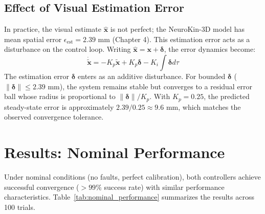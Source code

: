 \documentclass[12pt,a4paper,oneside]{report}
\begin{document}
\subsection{Effect of Visual Estimation Error}

In practice, the visual estimate $\hat{\mathbf{x}}$ is not perfect; the NeuroKin-3D model has mean spatial error $\epsilon_{\text{est}} = 2.39$ mm (Chapter 4). This estimation error acts as a disturbance on the control loop. Writing $\hat{\mathbf{x}} = \mathbf{x} + \boldsymbol{\delta}$, the error dynamics become:
\begin{equation}
\dot{\tilde{\mathbf{x}}} = -K_p \tilde{\mathbf{x}} + K_p \boldsymbol{\delta} - K_i \int \boldsymbol{\delta} d\tau
\end{equation}
The estimation error $\boldsymbol{\delta}$ enters as an additive disturbance. For bounded $\boldsymbol{\delta}$ ($\|\boldsymbol{\delta}\| \leq 2.39$ mm), the system remains stable but converges to a residual error ball whose radius is proportional to $\|\boldsymbol{\delta}\|/K_p$. With $K_p = 0.25$, the predicted steady-state error is approximately $2.39 / 0.25 \approx 9.6$ mm, which matches the observed convergence tolerance.

\section{Results: Nominal Performance}

Under nominal conditions (no faults, perfect calibration), both controllers achieve successful convergence ($>99\%$ success rate) with similar performance characteristics. Table~\ref{tab:nominal_performance} summarizes the results across 100 trials.

\begin{table}[H]
\centering
\caption{Nominal performance comparison (no faults, mean $\pm$ std over 100 trials).}
\label{tab:nominal_performance}
\end{table}
\end{document}
